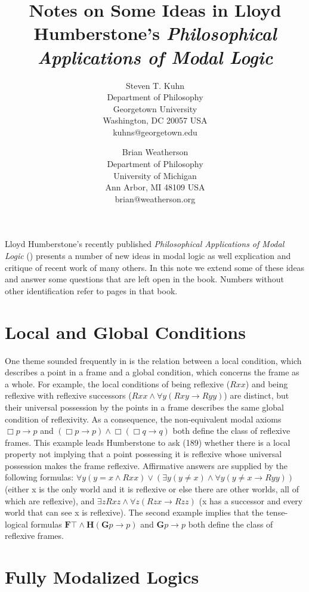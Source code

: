 \documentclass[11pt]{article}
\title{Notes on Some Ideas in Lloyd Humberstone's \textit{Philosophical Applications of Modal Logic}}
\author{Steven T. Kuhn\\Department of Philosophy\\Georgetown University\\Washington, DC 20057 USA\\kuhns@georgetown.edu \and Brian Weatherson\\Department of Philosophy\\University of Michigan\\Ann Arbor, MI 48109 USA\\brian@weatherson.org}
\begin{document}
\setlength{\affilsep}{.3em}
\begin{titlepage}
\maketitle
\end{titlepage}
\noindent Lloyd Humberstone's recently published \textit{Philosophical Applications of Modal Logic} (\citet{Humberstone2016}) presents a number of new ideas in modal logic as well explication and critique of recent work of many others. In this note we extend some of these ideas and answer some questions that are left open in the book. Numbers without other identification refer to pages in that book.


\section{Local and Global Conditions}

One theme sounded frequently in \citet{Humberstone2016} is the relation between a local condition, which describes a point in a frame and a global condition, which concerns the frame as a whole. For example, the local conditions of being reflexive ($Rxx$) and being reflexive with reflexive successors ($Rxx \land \forall y(Rxy \rightarrow Ryy)$) are distinct, but their universal possession by the points in a frame describes the same global condition of reflexivity. As a consequence, the non-equivalent modal axioms $\Box p\rightarrow p$ and $(\Box p\rightarrow p) \land \Box(\Box q\rightarrow q)$ both define the class of reflexive frames. This example leads Humberstone to ask (189) whether there is a local property not implying that a point possessing it is reflexive whose universal possession makes the frame reflexive. Affirmative answers are supplied by the following formulas:
$\forall y(y{=}x\wedge Rxx) \vee (\exists y(y\ne x) \wedge \forall y(y\ne x \rightarrow Ryy))$ (either x is the only world and it is reflexive or else there are other worlds, all of which are reflexive), and $\exists zRxz \wedge \forall z(Rzx \rightarrow Rzz)$ (x has a successor and every world that can see x is reflexive). The second example implies that the tense-logical formulas ${\mathbf{F}}\top \wedge \mathbf{H}(\mathbf{G}p\rightarrow p)$ and $\mathbf{G}p\rightarrow p$ both define the class of reflexive frames.

\section{Fully Modalized Logics}
\end{document}

